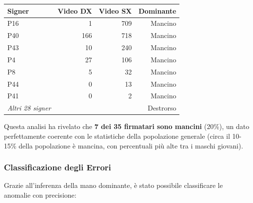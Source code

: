 \begin{center}
\begin{tabular}{lrrr}
\hline
\textbf{Signer} & \textbf{Video DX} & \textbf{Video SX} & \textbf{Dominante} \\
\hline
P16 & 1 & 709 & Mancino \\
P40 & 166 & 718 & Mancino \\
P43 & 10 & 240 & Mancino \\
P4  & 27 & 106 & Mancino \\
P8  & 5 & 32 & Mancino \\
P44 & 0 & 13 & Mancino \\
P41 & 0 & 2 & Mancino \\
\hline
\textit{Altri 28 signer} & & & Destrorso \\
\hline
\end{tabular}
\end{center}

Questa analisi ha rivelato che \textbf{7 dei 35 firmatari sono mancini} (20\%), un dato perfettamente coerente con le statistiche della popolazione generale (circa il 10-15\% della popolazione è mancina, con percentuali più alte tra i maschi giovani).

\subsubsection{Classificazione degli Errori}

Grazie all'inferenza della mano dominante, è stato possibile classificare le anomalie con precisione:

